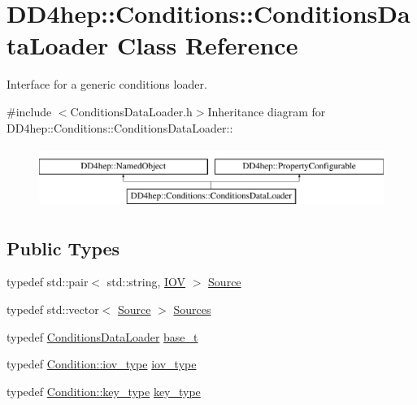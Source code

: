 \hypertarget{class_d_d4hep_1_1_conditions_1_1_conditions_data_loader}{
\section{DD4hep::Conditions::ConditionsDataLoader Class Reference}
\label{class_d_d4hep_1_1_conditions_1_1_conditions_data_loader}
}


Interface for a generic conditions loader.  


{\ttfamily \#include $<$ConditionsDataLoader.h$>$}Inheritance diagram for DD4hep::Conditions::ConditionsDataLoader::\begin{figure}[H]
\begin{center}
\leavevmode
\includegraphics[height=2cm]{class_d_d4hep_1_1_conditions_1_1_conditions_data_loader}
\end{center}
\end{figure}
\subsection*{Public Types}
\begin{DoxyCompactItemize}
\item 
typedef std::pair$<$ std::string, \hyperlink{class_d_d4hep_1_1_i_o_v}{IOV} $>$ \hyperlink{class_d_d4hep_1_1_conditions_1_1_conditions_data_loader_acad32659f22e37a422ec6abdb4f95b3e}{Source}
\item 
typedef std::vector$<$ \hyperlink{class_d_d4hep_1_1_conditions_1_1_conditions_data_loader_acad32659f22e37a422ec6abdb4f95b3e}{Source} $>$ \hyperlink{class_d_d4hep_1_1_conditions_1_1_conditions_data_loader_a10469a47fdf0b7949194f79c35ee9510}{Sources}
\item 
typedef \hyperlink{class_d_d4hep_1_1_conditions_1_1_conditions_data_loader}{ConditionsDataLoader} \hyperlink{class_d_d4hep_1_1_conditions_1_1_conditions_data_loader_a22a3a55163245ff24bca31db419433be}{base\_\-t}
\item 
typedef \hyperlink{class_d_d4hep_1_1_i_o_v}{Condition::iov\_\-type} \hyperlink{class_d_d4hep_1_1_conditions_1_1_conditions_data_loader_a510aa9a02f5e798d8d96c9e3cb5a36af}{iov\_\-type}
\item 
typedef \hyperlink{class_d_d4hep_1_1_conditions_1_1_condition_a7528efa762e8cc072ef80ea67c3531f9}{Condition::key\_\-type} \hyperlink{class_d_d4hep_1_1_conditions_1_1_conditions_data_loader_ac17b71656c9d6b5365c62d1d606ba8cc}{key\_\-type}
\end{DoxyCompactItemize}
